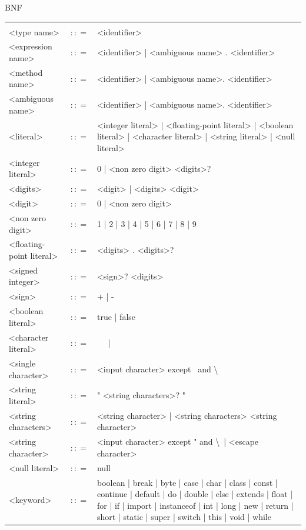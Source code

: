 \documentclass[landscape, 11pt]{article}
\begin{document}
\begin{qsection}{BNF}
\begin{enumerate}[label=\bt{\theenumi.}]
			\begin{longtable}{R{7cm} c L{15cm}}
													&					&	 \\
				<type name>									&	$\colon\colon=$	&	<identifier>
				\\
				<expression name>							&	$\colon\colon=$	&	<identifier> | <ambiguous name> . <identifier>
				\\
				<method name>								&	$\colon\colon=$	&	<identifier> | <ambiguous name>. <identifier>
				\\
				<ambiguous name>							&	$\colon\colon=$	&	<identifier> | <ambiguous name>. <identifier>
				\\
				<literal>									&	$\colon\colon=$	&	<integer literal> | <floating-point literal> | <boolean literal> | <character literal> | <string literal> | <null literal>
				\\
				<integer literal>							&	$\colon\colon=$	&	0 | <non zero digit> <digits>?
				\\
				<digits>									&	$\colon\colon=$	&	<digit> | <digits> <digit>
				\\
				<digit>										&	$\colon\colon=$	&	0 | <non zero digit>
				\\
				<non zero digit>							&	$\colon\colon=$	&	1 | 2 | 3 | 4 | 5 | 6 | 7 | 8 | 9
				\\
				<floating-point literal>					&	$\colon\colon=$	&	<digits> . <digits>?
				\\
				<signed integer>							&	$\colon\colon=$	&	<sign>? <digits>
				\\
				<sign>										&	$\colon\colon=$	&	+ | -
				\\
				<boolean literal>							&	$\colon\colon=$	&	true | false
				\\
				<character literal>							&	$\colon\colon=$	&	\textquotesingle\ <single character> \textquotesingle\ | \textquotesingle\ <escape sequence> \textquotesingle
				\\
				<single character>							&	$\colon\colon=$	&	<input character> except \textquotesingle\ and \textbackslash
				\\
				<string literal>							&	$\colon\colon=$	&	" <string characters>? "
				\\
				<string characters>							&	$\colon\colon=$	&	<string character> | <string characters> <string character>
				\\
				<string character>							&	$\colon\colon=$	&	<input character> except " and \textbackslash\ | <escape character>
				\\
				<null literal>								&	$\colon\colon=$	&	null
				\\
				<keyword>									&	$\colon\colon=$	&	boolean | break | byte | case | char | class | const | continue | default | do | double | else | extends | float | for | if | import | instanceof | int | long | new | return | short | static | super | switch | this | void | while
			\end{longtable}
	\end{enumerate}

\end{qsection}
\end{document}
